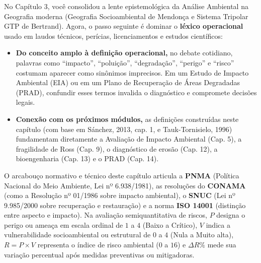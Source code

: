 \begin{capRevisao}
No Capítulo 3, você consolidou a lente epistemológica da Análise Ambiental na Geografia moderna (Geografia Socioambiental de Mendonça e Sistema Tripolar GTP de Bertrand). Agora, o passo seguinte é dominar o \textbf{léxico operacional} usado em laudos técnicos, perícias, licenciamentos e estudos científicos:
\begin{itemize}[leftmargin=1.5em, itemsep=2.5pt]
  \item \textbf{Do conceito amplo à definição operacional,} no debate cotidiano, palavras como ``impacto'', ``poluição'', ``degradação'', ``perigo'' e ``risco'' costumam aparecer como sinônimos imprecisos. Em um Estudo de Impacto Ambiental (EIA) ou em um Plano de Recuperação de Áreas Degradadas (PRAD), confundir esses termos invalida o diagnóstico e compromete decisões legais.
  \item \textbf{Conexão com os próximos módulos,} as definições construídas neste capítulo (com base em Sánchez, 2013, cap. 1, e Tauk-Tornisielo, 1996) fundamentam diretamente a Avaliação de Impacto Ambiental (Cap. 5), a fragilidade de Ross (Cap. 9), o diagnóstico de erosão (Cap. 12), a bioengenharia (Cap. 13) e o PRAD (Cap. 14).
\end{itemize}
\end{capRevisao}


\begin{boxSimbolo}
O arcabouço normativo e técnico deste capítulo articula a \textbf{PNMA} (Política Nacional do Meio Ambiente, Lei nº 6.938/1981), as resoluções do \textbf{CONAMA} (como a Resolução nº 01/1986 sobre impacto ambiental), o \textbf{SNUC} (Lei nº 9.985/2000 sobre recuperação e restauração) e a norma \textbf{ISO 14001} (distinção entre aspecto e impacto). Na avaliação semiquantitativa de riscos, $P$ designa o perigo ou ameaça em escala ordinal de $1$ a $4$ (Baixo a Crítico), $V$ indica a vulnerabilidade socioambiental ou estrutural de $0$ a $4$ (Nula a Muito alta), $R = P \times V$ representa o índice de risco ambiental ($0$ a $16$) e $\Delta R\%$ mede sua variação percentual após medidas preventivas ou mitigadoras.
\end{boxSimbolo}

